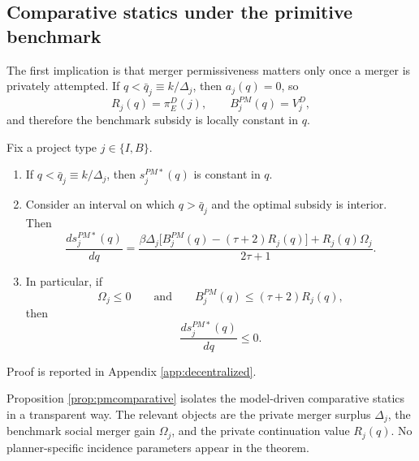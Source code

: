 \subsection{Comparative statics under the primitive benchmark}

The first implication is that merger permissiveness matters only once a merger is privately attempted. If $q<\bar q_j\equiv k/\Delta_j$, then $a_j(q)=0$, so
\begin{equation}
    R_j(q)=\pi_E^D(j),
    \qquad
    B_j^{PM}(q)=V_j^D,
\end{equation}
and therefore the benchmark subsidy is locally constant in $q$.

\begin{proposition}\label{prop:pmcomparative}
Fix a project type $j\in\{I,B\}$.
\begin{enumerate}
    \item If $q<\bar q_j\equiv k/\Delta_j$, then $s_j^{PM*}(q)$ is constant in $q$.

    \item Consider an interval on which $q>\bar q_j$ and the optimal subsidy is interior. Then
    \begin{equation}\label{eq:dspmdq}
        \frac{d s_j^{PM*}(q)}{dq}
        =
        \frac{
            \beta\Delta_j\bigl[B_j^{PM}(q)-(\tau+2)R_j(q)\bigr]
            +
            R_j(q)\Omega_j
        }{2\tau+1}.
    \end{equation}

    \item In particular, if
    \begin{equation}\label{eq:pmnegativecase}
        \Omega_j\le 0
        \qquad\text{and}\qquad
        B_j^{PM}(q)\le (\tau+2)R_j(q),
    \end{equation}
    then
    \begin{equation}
        \frac{d s_j^{PM*}(q)}{dq}\le 0.
    \end{equation}
\end{enumerate}
\end{proposition}

Proof is reported in Appendix \ref{app:decentralized}.

Proposition \ref{prop:pmcomparative} isolates the model-driven comparative statics in a transparent way. The relevant objects are the private merger surplus $\Delta_j$, the benchmark social merger gain $\Omega_j$, and the private continuation value $R_j(q)$. No planner-specific incidence parameters appear in the theorem.

